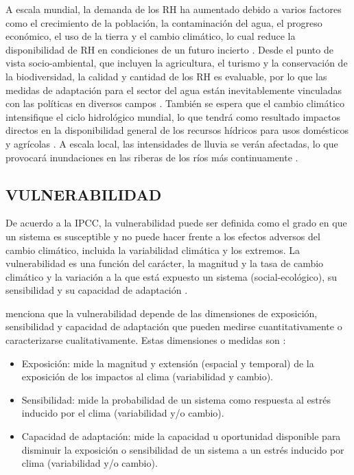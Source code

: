\documentclass[12pt]{article}
\begin{document}
A escala mundial, la demanda de los RH ha aumentado debido a varios factores como el crecimiento de la población, la contaminación del agua, el progreso económico, el uso de la tierra y el cambio climático, lo cual reduce la disponibilidad de RH en condiciones de un futuro incierto \citep{Davies2011}. Desde el punto de vista socio-ambiental, que incluyen la agricultura, el turismo y la conservación de la biodiversidad, la calidad y cantidad de los RH es evaluable, por lo que las medidas de adaptación para el sector del agua están inevitablemente vinculadas con las políticas en diversos campos \citep{Field2014}. También se espera que el cambio climático intensifique el ciclo hidrológico mundial, lo que tendrá como resultado impactos directos en la disponibilidad general de los recursos hídricos para usos domésticos y agrícolas \citep{Huntington2006}. A escala local, las intensidades de lluvia se verán afectadas, lo que provocará inundaciones en las riberas de los ríos más continuamente \citep{Wilby2010}.

\subsection{VULNERABILIDAD}

De acuerdo a la IPCC, la vulnerabilidad puede ser definida como el grado en que un sistema es susceptible y no puede hacer frente a los efectos adversos del cambio climático, incluida la variabilidad climática y los extremos. La vulnerabilidad es una función del carácter, la magnitud y la tasa de cambio climático y la variación a la que está expuesto un sistema (social-ecológico), su sensibilidad y su capacidad de adaptación \citep{parry2007climate}.

\citet{nelitz2013tools} menciona que la vulnerabilidad depende de las dimensiones de exposición, sensibilidad y capacidad de adaptación que pueden medirse cuantitativamente o caracterizarse cualitativamente. Estas dimensiones o medidas son \citep{glick2011scanning,fussel2006climate}:

\begin{itemize}
    \item Exposición: mide la magnitud y extensión (espacial y temporal) de la exposición de los impactos al clima (variabilidad y cambio).
    \item Sensibilidad: mide la probabilidad de un sistema como respuesta al estrés inducido por el clima (variabilidad y/o cambio).
    \item Capacidad de adaptación: mide la capacidad u oportunidad disponible para disminuir la exposición o sensibilidad de un sistema a un estrés inducido por clima (variabilidad y/o cambio).
\end{itemize}
\end{document}
